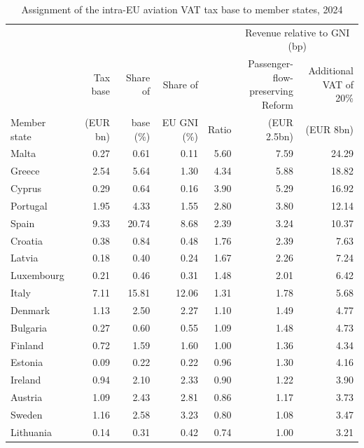 \documentclass{article}
\begin{document}
\begin{table}[htbp]
\centering
\caption{Assignment of the intra-EU aviation VAT tax base to member states, 2024}
\label{tab:vat_base_ms}
\small
\begin{tabular}{lrrrrrr}
\toprule
 & & & & & \multicolumn{2}{c}{Revenue relative to GNI (bp)} \\
\cmidrule(lr){6-7}
 & Tax base & Share of & Share of & & \makecell{Passenger-\\flow-\\preserving\\ Reform} & \makecell{Additional\\VAT of 20\%}\\
Member state & (EUR bn) & base (\%) & EU GNI (\%) & Ratio & (EUR 2.5bn) & (EUR 8bn) \\
\midrule
Malta          &  0.27 &   0.61 &   0.11 & 5.60 & 7.59 & 24.29 \\
Greece         &  2.54 &   5.64 &   1.30 & 4.34 & 5.88 & 18.82 \\
Cyprus         &  0.29 &   0.64 &   0.16 & 3.90 & 5.29 & 16.92 \\
Portugal       &  1.95 &   4.33 &   1.55 & 2.80 & 3.80 & 12.14 \\
Spain          &  9.33 &  20.74 &   8.68 & 2.39 & 3.24 & 10.37 \\
Croatia        &  0.38 &   0.84 &   0.48 & 1.76 & 2.39 &  7.63 \\
Latvia         &  0.18 &   0.40 &   0.24 & 1.67 & 2.26 &  7.24 \\
Luxembourg     &  0.21 &   0.46 &   0.31 & 1.48 & 2.01 &  6.42 \\
Italy          &  7.11 &  15.81 &  12.06 & 1.31 & 1.78 &  5.68 \\
Denmark        &  1.13 &   2.50 &   2.27 & 1.10 & 1.49 &  4.77 \\
Bulgaria       &  0.27 &   0.60 &   0.55 & 1.09 & 1.48 &  4.73 \\
Finland        &  0.72 &   1.59 &   1.60 & 1.00 & 1.36 &  4.34 \\
Estonia        &  0.09 &   0.22 &   0.22 & 0.96 & 1.30 &  4.16 \\
Ireland        &  0.94 &   2.10 &   2.33 & 0.90 & 1.22 &  3.90 \\
Austria        &  1.09 &   2.43 &   2.81 & 0.86 & 1.17 &  3.73 \\
Sweden         &  1.16 &   2.58 &   3.23 & 0.80 & 1.08 &  3.47 \\
Lithuania      &  0.14 &   0.31 &   0.42 & 0.74 & 1.00 &  3.21 \\

\end{tabular}
\end{table}
\end{document}
